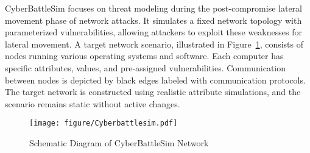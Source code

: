 CyberBattleSim focuses on threat modeling during the post-compromise lateral movement phase of network attacks. It simulates a fixed network topology with parameterized vulnerabilities, allowing attackers to exploit these weaknesses for lateral movement. A target network scenario, illustrated in Figure~\ref{CyberBattleSim}, consists of nodes running various operating systems and software. Each computer has specific attributes, values, and pre-assigned vulnerabilities. Communication between nodes is depicted by black edges labeled with communication protocols. The target network is constructed using realistic attribute simulations, and the scenario remains static without active changes.




\begin{figure}[tb]
    \centering
    \texttt{[image: figure/Cyberbattlesim.pdf]}
    \caption{Schematic Diagram of CyberBattleSim Network~\cite{Cyberbattlesim}}
    \label{CyberBattleSim}
\end{figure}


